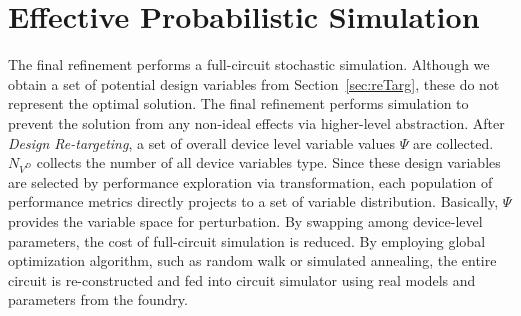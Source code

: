                                             
\section{Effective Probabilistic Simulation}\label{sec:ProbSimu}


  The final refinement performs a full-circuit stochastic simulation. Although we obtain a set of potential design variables from Section~\ref{sec:reTarg}, these do not represent the optimal solution. The final refinement performs simulation to prevent the solution from any non-ideal effects via higher-level abstraction. After {\it Design Re-targeting}, a set of overall device level variable values $\Psi $ are collected. $N_{V^D}$ collects the number of all device variables type. Since these design variables are selected by performance exploration via transformation, each population of performance metrics directly projects to a set of variable distribution. Basically, $\Psi$ provides the variable space for perturbation. By swapping among device-level parameters, the cost of full-circuit simulation is reduced. By employing global optimization algorithm, such as random walk or simulated annealing, the entire circuit is re-constructed and fed into circuit simulator using real models and parameters from the foundry.


